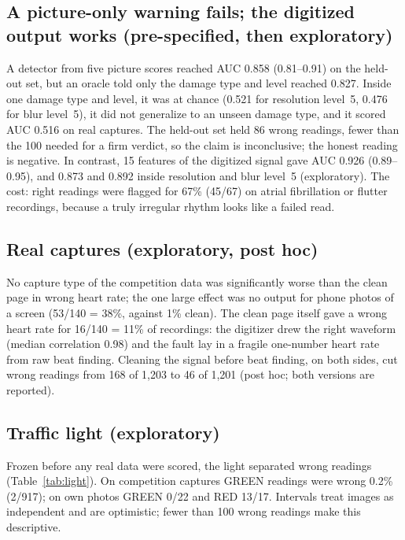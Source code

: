\documentclass[conference]{IEEEtran}
\begin{document}
\subsection{A picture-only warning fails; the digitized output works (pre-specified, then exploratory)}
A detector from five picture scores reached AUC 0.858 (0.81--0.91) on the held-out set, but an oracle told only the damage type and level reached 0.827. Inside one damage type and level, it was at chance (0.521 for resolution level~5, 0.476 for blur level~5), it did not generalize to an unseen damage type, and it scored AUC 0.516 on real captures. The held-out set held 86 wrong readings, fewer than the 100 needed for a firm verdict, so the claim is inconclusive; the honest reading is negative. In contrast, 15 features of the digitized signal gave AUC 0.926 (0.89--0.95), and 0.873 and 0.892 inside resolution and blur level~5 (exploratory). The cost: right readings were flagged for 67\% (45/67) on atrial fibrillation or flutter recordings, because a truly irregular rhythm looks like a failed read.

\subsection{Real captures (exploratory, post hoc)}
No capture type of the competition data was significantly worse than the clean page in wrong heart rate; the one large effect was no output for phone photos of a screen (53/140 = 38\%, against 1\% clean). The clean page itself gave a wrong heart rate for 16/140 = 11\% of recordings: the digitizer drew the right waveform (median correlation 0.98) and the fault lay in a fragile one-number heart rate from raw beat finding. Cleaning the signal before beat finding, on both sides, cut wrong readings from 168 of 1{,}203 to 46 of 1{,}201 (post hoc; both versions are reported).

\subsection{Traffic light (exploratory)}
Frozen before any real data were scored, the light separated wrong readings (Table~\ref{tab:light}). On competition captures GREEN readings were wrong 0.2\% (2/917); on own photos GREEN 0/22 and RED 13/17. Intervals treat images as independent and are optimistic; fewer than 100 wrong readings make this descriptive.
\end{document}
